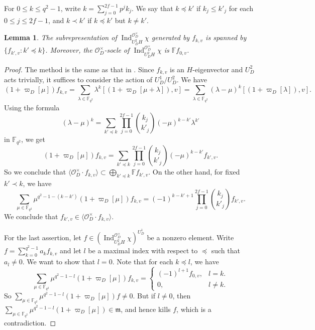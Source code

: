 \documentclass{article}
\newtheorem{lemma}[definition]{Lemma}
\numberwithin{equation}{section}
\DeclareMathOperator{\Ind}{Ind}
\newcommand{\Indu}[3]{\Ind_{#1}^{#2}{#3}}
\newcommand{\fm}{\mathfrak{m}}
\newcommand{\bF}{\mathbb{F}}
\newcommand{\cO}{\mathcal{O}}
\begin{document}
For $0\leq k\leq q^2-1$, write $k=\sum_{j=0}^{2f-1}p^jk_j$. 
We say that $k\preccurlyeq k'$ if $k_j\leq k'_j$ for each $0\leq j\leq 2f-1$, and 
$k\prec k'$ if $k\preccurlyeq k'$ but $k\ne k'$.  

\begin{lemma}
    The subrepresentation of $\Indu{U_D^2H}{\cO_D^\times}{\chi}$ generated by $f_{k,v}$ is spanned by 
    $\{f_{k',v}:k'\preccurlyeq k\}$. Moreover, the $\cO_D^\times$-socle of $\Indu{U_D^2H}{\cO_D^\times}{\chi}$ is $\bF f_{0,v}$. 
\end{lemma}

\begin{proof}
    The method is the same as that in \cite[Prop.~2.7]{HW24b}. 
    Since $f_{k,v}$ is an $H$-eigenvector and $U^2_D$ acts trivially, it suffices to consider the action of $U_D^1/U_D^2$. 
    We have 
    $$(1+\varpi_D[\mu])f_{k,v}=\sum_{\lambda\in\bF_{q^2}}\lambda^k[(1+\varpi_D[\mu+\lambda]),v]=\sum_{\lambda\in\bF_{q^2}}(\lambda-\mu)^k[(1+\varpi_D[\lambda]),v].$$
    Using the formula
    $$(\lambda-\mu)^k=\sum_{k'\preccurlyeq k}\prod_{j=0}^{2f-1}\binom{k_j}{k'_j}(-\mu)^{k-k'}\lambda^{k'}$$
    in $\bF_{q^2}$, we get 
    $$(1+\varpi_D[\mu])f_{k,v}=\sum_{k'\preccurlyeq k}\prod_{j=0}^{2f-1}\binom{k_j}{k'_j}(-\mu)^{k-k'} f_{k',v}.$$
    So we conclude that $\langle\cO_D^\times\cdot f_{k,v}\rangle\subset \bigoplus_{k'\preccurlyeq k}\bF f_{k',v}$. 
    On the other hand, for fixed $k'\prec k$, we have 
    $$\sum_{\mu\in {\bF_{q^2}}}\mu^{q^2-1-(k-k')}(1+\varpi_D[\mu])f_{k,v}=(-1)^{k-k'+1}\prod_{j=0}^{2f-1}\binom{k_j}{k'_j}f_{k',v}.$$
    We conclude that $f_{k',v}\in \langle\cO_D^\times\cdot f_{k,v}\rangle$. 

    For the last assertion, let $f\in (\Indu{U_D^2H}{\cO_D^\times}{\chi})^{U_D^1}$ be a nonzero element. 
    Write $f=\sum_{k=0}^{q^2-1} a_kf_{k,v}$ and let $l$ be a maximal index with respect to $\preccurlyeq$ such that $a_l\ne 0$. 
    We want to show that $l=0$. Note that for each $k\preccurlyeq l$, 
    we have 
    $$\sum_{\mu\in {\bF_{q^2}}}\mu^{q^2-1-l}(1+\varpi_D[\mu])f_{k,v}=\begin{cases}
        (-1)^{l+1}f_{0,v}, & l=k.\\
        0, & l\ne k.
    \end{cases} $$
    So $\sum_{\mu\in {\bF_{q^2}}}\mu^{q^2-1-l}(1+\varpi_D[\mu]) f\ne 0$. 
    But if $l\ne 0$, then $\sum_{\mu\in {\bF_{q^2}}}\mu^{q^2-1-l}(1+\varpi_D[\mu])\in\fm$, 
    and hence kills $f$, which is a contradiction. 
\end{proof}
\end{document}
